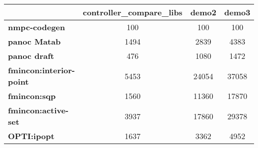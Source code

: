 \begin{tiny}\begin{tabular}{|l|c|c|c|}
\hline
&\textbf{controller_compare_libs}&\textbf{demo2}&\textbf{demo3}\\\hline
\textbf{nmpc-codegen}&100&100&100\\\hline
\textbf{panoc Matab}&1494&2839&4383\\\hline
\textbf{panoc draft}&476&1080&1472\\\hline
\textbf{fmincon:interior-point}&5453&24054&37058\\\hline
\textbf{fmincon:sqp}&1560&11360&17870\\\hline
\textbf{fmincon:active-set}&3937&17860&29378\\\hline
\textbf{OPTI:ipopt}&1637&3362&4952\\\hline
\end{tabular}
\end{tiny}